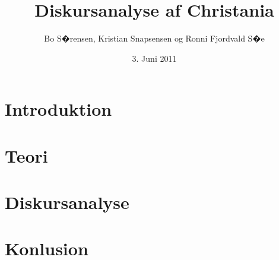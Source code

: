 \documentclass[10pt, a4paper, twoside, danish]{report}
\author{Bo S�rensen, Kristian Snapsensen og Ronni Fjordvald S�e}
\date{3. Juni 2011}
\title{Diskursanalyse af Christania}
\begin{document}
\maketitle

\cleardoublepage

\cleardoublepage

\cleardoublepage
\tableofcontents
\thispagestyle{empty}
\cleardoublepage

\chapter{Introduktion}{}\label{chap:introduktion}\newpage


\clearpage
\newpage
\thispagestyle{empty}
\cleardoublepage
\newpage


\chapter{Teori}{}\label{chap:teori}\newpage


\clearpage
\newpage
\thispagestyle{empty}
\cleardoublepage
\newpage


\chapter{Diskursanalyse}{}\label{chap:diskursanalyse}\newpage


\clearpage
\newpage
\thispagestyle{empty}
\cleardoublepage
\newpage



\chapter{Konlusion}{}\label{chap:konklusion}\newpage


\clearpage
\newpage
\thispagestyle{empty}
\cleardoublepage
\newpage


%







\small{
\renewcommand{\bibname}{Referencer}

}
\clearpage
\newpage
\thispagestyle{empty}
\cleardoublepage
\newpage
\end{document}

